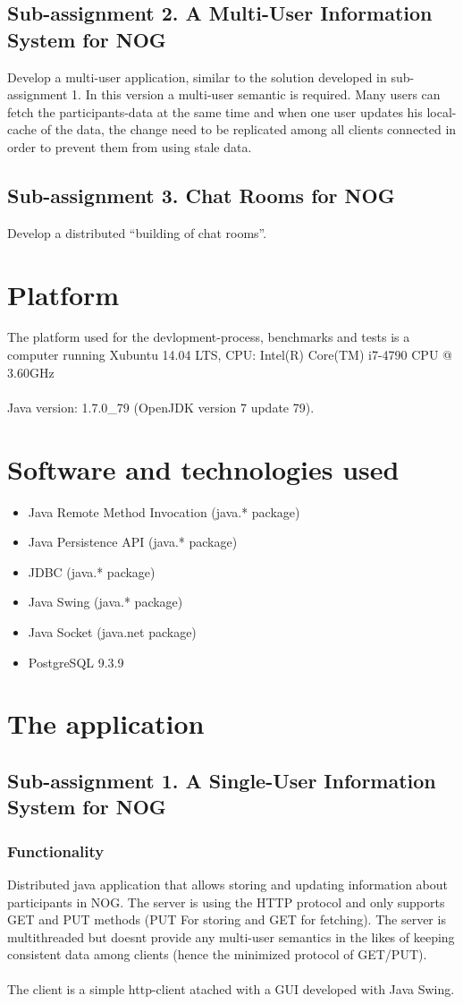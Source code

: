 \documentclass[a4paper, 11pt]{article}
\begin{document}
\subsection{Sub-assignment 2. A Multi-User Information System for NOG}
Develop a multi-user application, similar to the solution developed in sub-assignment 1. In this version a multi-user semantic is required. Many users can fetch the participants-data at the same time and when one user updates his local-cache of the data, the change need to be replicated among all clients connected in order to prevent them from using stale data.
\subsection{Sub-assignment 3. Chat Rooms for NOG}
Develop a distributed ``building of chat rooms''.

\newpage
\section{Platform}
The platform used for the devlopment-process, benchmarks and tests is a computer running Xubuntu 14.04 LTS, CPU: Intel(R) Core(TM) i7-4790 CPU @ 3.60GHz \\ \\
Java version: 1.7.0\_79  (OpenJDK version 7 update 79).
\section{Software and technologies used}
\begin{itemize}
\item Java Remote Method Invocation (java.* package)
\item Java Persistence API (java.* package)
\item JDBC (java.* package)
\item Java Swing (java.* package)
\item Java Socket (java.net package)
\item PostgreSQL 9.3.9
\end{itemize}
\newpage
\section{The application}
\subsection{Sub-assignment 1. A Single-User Information System for NOG}
\subsubsection{Functionality}
Distributed java application that allows storing and updating information about participants in NOG. The server is using the HTTP protocol and only supports GET and PUT methods (PUT For storing and GET for fetching). The server is multithreaded but doesnt provide any multi-user semantics in the likes of keeping consistent data among clients (hence the minimized protocol of GET/PUT).
\\\\The client is a simple http-client atached with a GUI developed with Java Swing.
\end{document}
